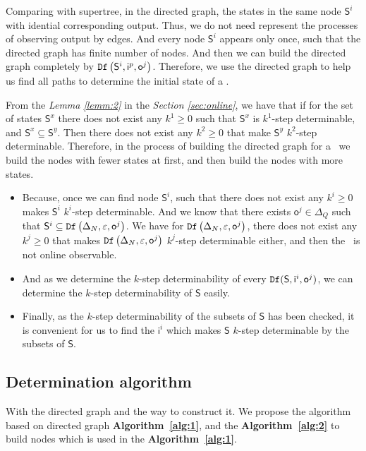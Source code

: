 Comparing with supertree, in the directed graph, the states in the same node $\mathsf{S}^i$ with idential corresponding output. Thus, we do not need represent the processes of observing output by edges. And every node $\mathsf{S}^i$ appears only once, such that the directed graph has finite number of nodes. And then we can build the directed graph completely by ${\tt Df}\left(\mathsf{S}^i,\mathsf{i}^{p},\mathsf{o}^{j}\right)$. Therefore, we use the directed graph to help us find all paths to determine the initial state of a \BCN.

From the {\em Lemma \ref{lemm:2}} in the {\em Section \ref{sec:online}}, we have that if for the set of states $\mathsf{S}^x$ there does not exist any $k^{1}\ge 0$ such that $\mathsf{S}^{x}$ is $k^{1}$-step determinable, and $\mathsf{S}^{x}\subseteq \mathsf{S}^{y}$. Then there does not exist any $k^{2}\ge 0$ that make $\mathsf{S}^{y}$ $k^{2}$-step determinable. Therefore, in the process of building the directed graph for a \BCN\ we build the nodes with fewer states at first, and then build the nodes with more states.
\begin{itemize}
\item  Because, once we can find node $\mathsf{S}^i$, such that there does not exist any $k^{i}\ge0$ makes $\mathsf{S}^{i}$ $k^{i}$-step determinable. And we know that there exists $\mathsf{o}^{j}\in \Delta_Q$ such that $\mathsf{S}^{i}\subseteq {\tt Df}\left(\Delta_N,\varepsilon, \mathsf{o}^{j}\right)$. We have for ${\tt Df}\left(\Delta_N,\varepsilon, \mathsf{o}^{j}\right)$, there does not exist any $k^{j}\ge 0$ that makes  ${\tt Df}\left(\Delta_N,\varepsilon, \mathsf{o}^{j}\right)$ $k^{j}$-step determinable either, and then the \BCN\ is not online observable.
\item And as we determine the $k$-step determinability of every ${\tt Df}(\mathsf{S},\mathsf{i}^{i},\mathsf{o}^{j})$, we can determine the $k$-step determinability of $\mathsf{S}$ easily.
\item  Finally, as the $k$-step determinability of the subsets of $\mathsf{S}$ has been checked, it is convenient for us to find the $\mathsf{i}^{i}$ which makes $\mathsf{S}$ $k$-step determinable by the subsets of $\mathsf{S}$.
 \end{itemize}
 \subsection{Determination algorithm}
With the directed graph and the way to construct it. We propose the algorithm based on directed graph {\bf Algorithm~\ref{alg:1}}, and the {\bf Algorithm~\ref{alg:2}} to build nodes which is used in the {\bf Algorithm~\ref{alg:1}}.

